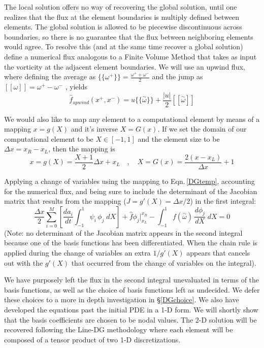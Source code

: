 \documentclass[letterpaper,12pt]{report}
\newcommand{\be}{\begin{equation}}
\newcommand{\ben}[1]{\begin{equation}\label{#1}}
\newcommand{\ee}{\end{equation}}
\newcommand{\aomega}{\overset{\sim}{\omega}}				%
\begin{document}
The local solution offers no way of recovering the global solution, until one realizes that the flux at the element boundaries is multiply defined between elements. The global solution is allowed to be piecewise discontinuous across boundaries, so there is no guarantee that the flux between neighboring elements would agree. To resolve this (and at the same time recover a global solution) define a numerical flux analogous to a Finite Volume Method that takes as input the vorticity at the adjacent element boundaries. We will use an upwind flux, where defining the average as $\{\!\{\omega^+\}\!\} = \frac{\omega^++\omega^-}{2}$ and the jump as $[[\omega]]=\omega^+-\omega^-$ \cite{HestWar}, yields
\be \hat{f}_{upwind}(x^+,x^-)=u\{\!\{\aomega\}\!\} + \frac{|u|}{2}[[\aomega]]\ee

We would also like to map any element to a computational element by means of a mapping $x=g(X)$ and it's inverse $X=G(x)$. If we set the domain of our computational element to be $X \in [-1, 1]$ and the element size to be $\Delta x = x_R - x_L$, then the mapping is
\be x=g(X)=\frac{X+1}{2}\Delta x + x_L\quad ,\quad X=G(x)=\frac{2(x-x_L)}{\Delta x}+1 \ee

Applying a change of variables using the mapping to Eqn.\,\eqref{DGtemp}, accounting for the numerical flux, and being sure to include the determinant of the Jacobian matrix that results from the mapping ($J=g'(X)=\Delta x/2$) in the first integral:
\ben{DGtemp2} \frac{\Delta x}{2}	\sum_{i=0}^M \left[ \frac{d a_i}{dt}	\int_{-1}^{1}\psi_i  \, \phi_j \;dX \right]
+\hat{f}\phi_j \Big|^{x_R}_{x_L} 
- \int_{-1}^{1} f(\aomega) \, \frac{d \phi_j}{dX} \;dX = 0 \ee
(Note: no determinant of the Jacobian matrix appears in the second integral because one of the basis functions has been differentiated. When the chain rule is applied during the change of variables an extra $1/g'(X)$ appears that cancels out with the $g'(X)$ that occurred from the change of variables on the integral).

We have purposely left the flux in the second integral unevaluated in terms of the basis functions, as well as the choice of basis functions left as undecided. We defer these choices to a more in depth investigation in \S \ref{DGchoice}. We also have developed the equations past the initial PDE in a 1-D form. We will shortly show that the basis coefficients are chosen to be nodal values. The 2-D solution will be recovered following the Line-DG methodology \cite{Persson2013} where each element will be composed of a tensor product of two 1-D discretizations.
\end{document}
